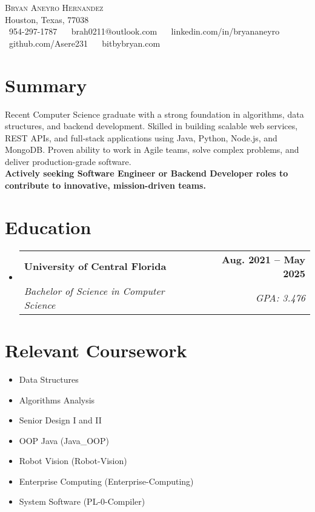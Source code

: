 \documentclass[letterpaper,11pt]{article}
\makeatletter
\newcommand{\resumeSubheading}[4]{
  \vspace{-2pt}\item
    \begin{tabular*}{1.0\textwidth}[t]{l@{\extracolsep{\fill}}r}
      \textbf{#1} & \textbf{\small #2} \\
      \textit{\small#3} & \textit{\small #4} \\
    \end{tabular*}\vspace{-7pt}
}
\newcommand{\resumeSubHeadingListStart}{\begin{itemize}[leftmargin=0.0in, label={}]}
\newcommand{\resumeSubHeadingListEnd}{\end{itemize}}
\makeatother
\begin{document}
\scriptsize

\begin{center}
    {\Huge \scshape Bryan Aneyro Hernandez} \\ \vspace{1pt}
    Houston, Texas, 77038 \\ \vspace{1pt}
    \small \raisebox{-0.1\height}\faPhone\ 954-297-1787 ~ 
    \small \raisebox{-0.2\height}\faEnvelope\ brah0211@outlook.com ~ 
     \small \raisebox{-0.2\height}\faLinkedin\ linkedin.com/in/bryananeyro ~
    \small \raisebox{-0.2\height}\faGithub\ github.com/Asere231 ~
    \small \raisebox{-0.2\height}\faGlobe\ bitbybryan.com
    \vspace{-8pt}
\end{center}

\section{Summary}
\small{
Recent Computer Science graduate with a strong foundation in algorithms, data structures, and backend development. Skilled in building scalable web services, REST APIs, and full-stack applications using Java, Python, Node.js, and MongoDB. Proven ability to work in Agile teams, solve complex problems, and deliver production-grade software.\\
\textbf{Actively seeking Software Engineer or Backend Developer roles to contribute to innovative, mission-driven teams.}
}

\section{Education}
\resumeSubHeadingListStart
  \resumeSubheading
    {University of Central Florida}{Aug. 2021 -- May 2025}
    {Bachelor of Science in Computer Science}{GPA: 3.476}
\resumeSubHeadingListEnd

\section{Relevant Coursework}
\begin{multicols}{2}
    \begin{itemize}[itemsep=-5pt, parsep=3pt]
        \item Data Structures
        \item Algorithms Analysis
        \item Senior Design I and II
        \item OOP Java (Java\_OOP)
        \item Robot Vision (Robot-Vision)
        \item Enterprise Computing (Enterprise-Computing)
        \item System Software (PL-0-Compiler)
    \end{itemize}
\end{multicols}
\vspace*{2.0\multicolsep}
\end{document}

